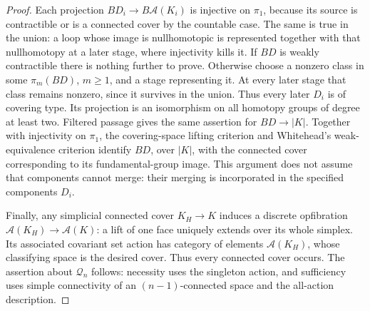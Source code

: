 \begin{proof}
Each projection $BD_i\to B\mathcal A(K_i)$ is injective on $\pi_1$, because its source is contractible or is a connected cover by the countable case. The same is true in the union: a loop whose image is nullhomotopic is represented together with that nullhomotopy at a later stage, where injectivity kills it. If $BD$ is weakly contractible there is nothing further to prove. Otherwise choose a nonzero class in some $\pi_m(BD)$, $m\geq1$, and a stage representing it. At every later stage that class remains nonzero, since it survives in the union. Thus every later $D_i$ is of covering type. Its projection is an isomorphism on all homotopy groups of degree at least two. Filtered passage gives the same assertion for $BD\to|K|$. Together with injectivity on $\pi_1$, the covering-space lifting criterion and Whitehead's weak-equivalence criterion identify $BD$, over $|K|$, with the connected cover corresponding to its fundamental-group image. This argument does not assume that components cannot merge: their merging is incorporated in the specified components $D_i$.

Finally, any simplicial connected cover $K_H\to K$ induces a discrete opfibration $\mathcal A(K_H)\to\mathcal A(K)$: a lift of one face uniquely extends over its whole simplex. Its associated covariant set action has category of elements $\mathcal A(K_H)$, whose classifying space is the desired cover. Thus every connected cover occurs. The assertion about $\mathcal Q_n$ follows: necessity uses the singleton action, and sufficiency uses simple connectivity of an $(n-1)$-connected space and the all-action description.
\end{proof}

